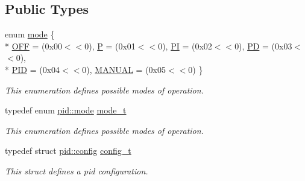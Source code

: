 \subsection*{Public Types}
\begin{DoxyCompactItemize}
\item 
enum \hyperlink{classpid_ae300b76b8ca84b4e1f31500d843b61c5}{mode} \{ \\*
\hyperlink{classpid_ae300b76b8ca84b4e1f31500d843b61c5a3442f51b9d005da09c503db8fc04c87e}{O\-F\-F} = (0x00$<$$<$0), 
\hyperlink{classpid_ae300b76b8ca84b4e1f31500d843b61c5ab6e3780aa2acb802e55938be52071479}{P} = (0x01$<$$<$0), 
\hyperlink{classpid_ae300b76b8ca84b4e1f31500d843b61c5a181d6db28b66c2004cc031ddd1bdc250}{P\-I} = (0x02$<$$<$0), 
\hyperlink{classpid_ae300b76b8ca84b4e1f31500d843b61c5a2c3bf3e1c762f262d308657940ec0e44}{P\-D} = (0x03$<$$<$0), 
\\*
\hyperlink{classpid_ae300b76b8ca84b4e1f31500d843b61c5a3f486378a0db9447a3cc7dd3d0bbfe81}{P\-I\-D} = (0x04$<$$<$0), 
\hyperlink{classpid_ae300b76b8ca84b4e1f31500d843b61c5afb96a9929ef61cb7fd7b00a6e71106b2}{M\-A\-N\-U\-A\-L} = (0x05$<$$<$0)
 \}
\begin{DoxyCompactList}\small\item\em This enumeration defines possible modes of operation. \end{DoxyCompactList}\item 
\hypertarget{classpid_a22af7b8da10bf9878ae85f6a90991054}{typedef enum \hyperlink{classpid_ae300b76b8ca84b4e1f31500d843b61c5}{pid\-::mode} \hyperlink{classpid_a22af7b8da10bf9878ae85f6a90991054}{mode\-\_\-t}}\label{classpid_a22af7b8da10bf9878ae85f6a90991054}

\begin{DoxyCompactList}\small\item\em This enumeration defines possible modes of operation. \end{DoxyCompactList}\item 
\hypertarget{classpid_a13d711458f38f6f9e39baa39a6353a1f}{typedef struct \hyperlink{structpid_1_1config}{pid\-::config} \hyperlink{classpid_a13d711458f38f6f9e39baa39a6353a1f}{config\-\_\-t}}\label{classpid_a13d711458f38f6f9e39baa39a6353a1f}

\begin{DoxyCompactList}\small\item\em This struct defines a pid configuration. \end{DoxyCompactList}\end{DoxyCompactItemize}
